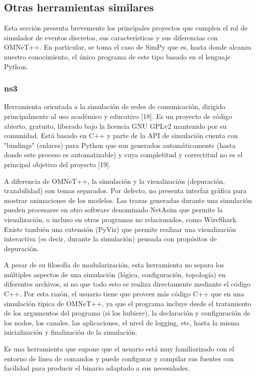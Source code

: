 \documentclass[]{article}
\begin{document}
\subsection{Otras herramientas similares}

Esta sección presenta brevemente los principales proyectos que cumplen el rol
de simulador de eventos discretos, sus características y sus diferencias con
OMNeT++. En particular, se toma el caso de SimPy que es, hasta donde alcanza
nuestro conocimiento, el único programa de este tipo basado en el lenguaje
Python.

\subsubsection{ns3}

Herramienta orientada a la simulación de redes de comunicación, dirigido
principalmente al uso académico y educativo [18]. Es un proyecto de código
abierto, gratuito, liberado bajo la licencia GNU GPLv2 mantenido por su
comunidad. Está basado en C++ y parte de la API de simulación cuenta con
"bindings" (enlaces) para Python que son generados automáticamente (hasta
donde este proceso es automatizable) y cuya completitud y correctitud no es el
principal objetivo del proyecto [19].

A diferencia de OMNeT++, la simulación y la visualización (depuración,
trazabilidad) son temas separados. Por defecto, no presenta interfaz gráfica
para mostrar animaciones de los modelos. Las trazas generadas durante una
simulación pueden procesarse en otro software denominado NetAsim que permite la
visualización, o incluso en otros programas no relacionados, como WireShark.
Existe también una extensión (PyViz) que permite realizar una visualización
interactiva (es decir, durante la simulación) pensada con propósitos de
depuración.

A pesar de su filosofía de modularización, esta herramienta no separa los
múltiples aspectos de una simulación (lógica, configuración, topología) en
diferentes archivos, si no que todo esto se realiza  directamente mediante el
código C++. Por esta razón, el usuario tiene que proveer más código C++ que en
una simulación típica de OMNeT++, ya que el programa incluye desde el
tratamiento de los argumentos del programa (si los hubiere), la declaración y
configuración de los nodos, los canales, las aplicaciones, el nivel de logging,
etc, hasta la misma inicialización y finalización de la simulación.

Es una herramienta que supone que el usuario está muy familiarizado con el
entorno de línea de comandos y puede configurar y compilar sus fuentes con
facilidad para producir el binario adaptado a sus necesidades.
\end{document}
